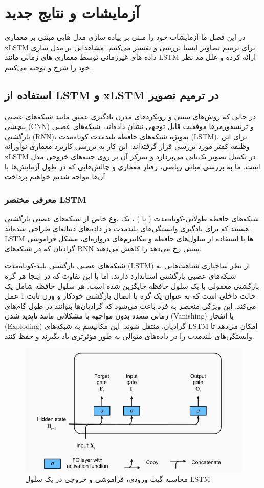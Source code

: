 
\chapter{آزمایشات و نتایج جدید}

در این فصل ما آزمایشات خود را مبنی بر پیاده سازی مدل هایی مبتنی بر معماری xLSTM برای ترمیم تصاویر ایستا بررسی و تفسیر می‌کنیم. مشاهداتی بر مدل سازی داده های غیرزمانی توسط معماری های زمانی مانند LSTM ارائه کرده و علل مد نظر خود را شرح و توجیه می‌کنیم.

\section{استفاده از LSTM و xLSTM در ترمیم تصویر}

در حالی که روش‌های سنتی و رویکردهای مدرن یادگیری عمیق مانند شبکه‌های عصبی پیچشی (CNN) و ترنسفورمرها موفقیت قابل توجهی نشان داده‌اند، شبکه‌های عصبی بازگشتی (RNN)، به‌ویژه شبکه‌های حافظه بلندمدت کوتاه‌مدت (LSTM)، برای این وظیفه کمتر مورد بررسی قرار گرفته‌اند. این کار به بررسی کاربرد معماری نوآورانه xLSTM در تکمیل تصویر یک‌تایی می‌پردازد و تمرکز آن بر روی جنبه‌های خروجی مدل است. ما به بررسی مبانی ریاضی، رفتار معماری و چالش‌هایی که در طول آزمایش‌ها با آن‌ها مواجه شدیم خواهیم پرداخت.

\subsection{معرفی مختصر LSTM}
شبکه‌های حافظه طولانی-کوتاه‌مدت ( یا )
\cite{hochreiterLongShortTermMemory1997}
، یک نوع خاص از شبکه‌های عصبی بازگشتی هستند که برای یادگیری وابستگی‌های بلندمدت در داده‌های دنباله‌ای طراحی شده‌اند. LSTM ها با استفاده از سلول‌های حافظه و مکانیزم‌های دروازه‌ای، مشکل فراموشی گرادیان که در شبکه‌های RNN سنتی رخ می‌دهد را کاهش می‌دهند. 

شبکه‌های عصبی بازگشتی بلند-کوتاه‌مدت (LSTM) از نظر ساختاری شباهت‌هایی به شبکه‌های عصبی بازگشتی استاندارد دارند، اما با این تفاوت که در اینجا هر گره بازگشتی معمولی با یک سلول حافظه جایگزین شده است. هر سلول حافظه شامل یک حالت داخلی است که به عنوان یک گره با اتصال بازگشتی خودکار و وزن ثابت 1 عمل می‌کند. این ویژگی منحصر به فرد باعث می‌شود که گرادیان‌ها بتوانند در طول گام‌های زمانی متعدد بدون مواجهه با مشکلاتی مانند ناپدید شدن (Vanishing) یا انفجار (Exploding) گرادیان، منتقل شوند. این مکانیسم به شبکه‌های LSTM امکان می‌دهد تا وابستگی‌های بلندمدت را در داده‌های متوالی به طور مؤثرتری یاد بگیرند و حفظ کنند.

\begin{figure}
	\centering
	\includegraphics[width=0.7\linewidth]{lstm1}
	\caption{محاسبه گیت ورودی،‌ فراموشی و خروجی در یک سلول LSTM}
	\label{fig:lstm1}
\end{figure}


